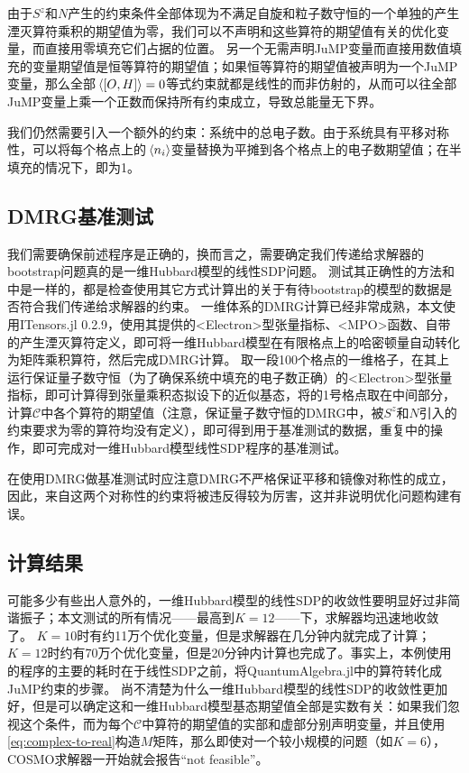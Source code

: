 \documentclass[oneside]{fduthesis}
\def\texttt#1{<#1>}%
\begin{document}
由于$S^z$和$N$产生的约束条件全部体现为不满足自旋和粒子数守恒的一个单独的产生湮灭算符乘积的期望值为零，我们可以不声明和这些算符的期望值有关的优化变量，而直接用零填充它们占据的位置。
另一个无需声明JuMP变量而直接用数值填充的变量期望值是恒等算符的期望值；如果恒等算符的期望值被声明为一个JuMP变量，那么全部$\expval*{\comm{O}{H}} = 0$等式约束就都是线性的而非仿射的，从而可以往全部JuMP变量上乘一个正数而保持所有约束成立，导致总能量无下界。

我们仍然需要引入一个额外的约束：系统中的总电子数。由于系统具有平移对称性，可以将每个格点上的$\expval*{n_i}$变量替换为平摊到各个格点上的电子数期望值；在半填充的情况下，即为1。

\subsection{DMRG基准测试}

我们需要确保前述程序是正确的，换而言之，需要确定我们传递给求解器的bootstrap问题真的是一维Hubbard模型的线性SDP问题。
测试其正确性的方法和中是一样的，都是检查使用其它方式计算出的关于有待bootstrap的模型的数据是否符合我们传递给求解器的约束。
一维体系的DMRG计算已经非常成熟，本文使用ITensors.jl 0.2.9\cite{itensor,itensor-lib}，使用其提供的\texttt{Electron}型张量指标、\texttt{MPO}函数、自带的产生湮灭算符定义，即可将一维Hubbard模型在有限格点上的哈密顿量自动转化为矩阵乘积算符，然后完成DMRG计算。
取一段100个格点的一维格子，在其上运行保证量子数守恒（为了确保系统中填充的电子数正确）的\texttt{Electron}型张量指标，即可计算得到张量乘积态拟设下的近似基态，将的1号格点取在中间部分，计算$\mathcal{C}$中各个算符的期望值（注意，保证量子数守恒的DMRG中，被$S^z$和$N$引入的约束要求为零的算符均没有定义），即可得到用于基准测试的数据，重复中的操作，即可完成对一维Hubbard模型线性SDP程序的基准测试。

在使用DMRG做基准测试时应注意DMRG不严格保证平移和镜像对称性的成立，因此，来自这两个对称性的约束将被违反得较为厉害，这并非说明优化问题构建有误。

\subsection{计算结果}

可能多少有些出人意外的，一维Hubbard模型的线性SDP的收敛性要明显好过非简谐振子；本文测试的所有情况——最高到$K=12$——下，求解器均迅速地收敛了。
$K=10$时有约11万个优化变量，但是求解器在几分钟内就完成了计算；$K=12$时约有70万个优化变量，但是20分钟内计算也完成了。事实上，本例使用的程序的主要的耗时在于线性SDP之前，将QuantumAlgebra.jl中的算符转化成JuMP约束的步骤。
尚不清楚为什么一维Hubbard模型的线性SDP的收敛性更加好，但是可以确定这和一维Hubbard模型基态期望值全部是实数有关：如果我们忽视这个条件，而为每个$\mathcal{C}$中算符的期望值的实部和虚部分别声明变量，并且使用\eqref{eq:complex-to-real}构造$M$矩阵，那么即使对一个较小规模的问题（如$K=6$），COSMO求解器一开始就会报告“not feasible”。
\end{document}
